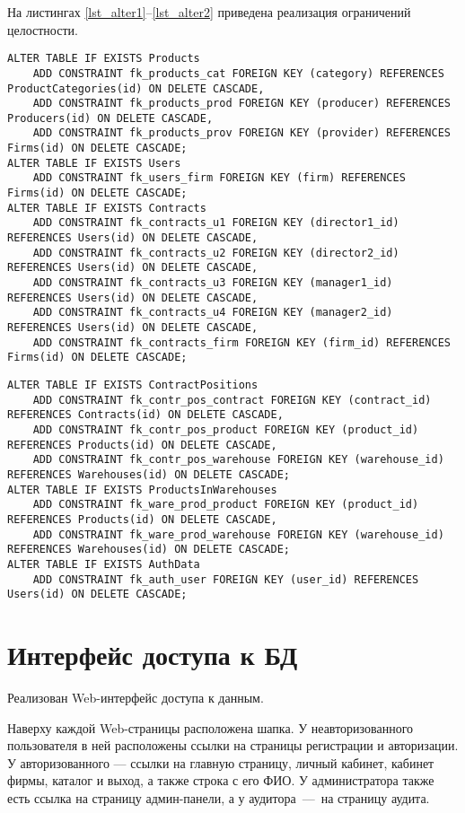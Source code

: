 На листингах \ref{lst_alter1}--\ref{lst_alter2} приведена реализация ограничений целостности.
\begin{lstlisting}[label=lst_alter1,caption=\raggedright{Реализация ограничений целостности}]
ALTER TABLE IF EXISTS Products 
	ADD CONSTRAINT fk_products_cat FOREIGN KEY (category) REFERENCES ProductCategories(id) ON DELETE CASCADE,
	ADD CONSTRAINT fk_products_prod FOREIGN KEY (producer) REFERENCES Producers(id) ON DELETE CASCADE,
	ADD CONSTRAINT fk_products_prov FOREIGN KEY (provider) REFERENCES Firms(id) ON DELETE CASCADE;
ALTER TABLE IF EXISTS Users 
	ADD CONSTRAINT fk_users_firm FOREIGN KEY (firm) REFERENCES Firms(id) ON DELETE CASCADE;
ALTER TABLE IF EXISTS Contracts 
	ADD CONSTRAINT fk_contracts_u1 FOREIGN KEY (director1_id) REFERENCES Users(id) ON DELETE CASCADE,
	ADD CONSTRAINT fk_contracts_u2 FOREIGN KEY (director2_id) REFERENCES Users(id) ON DELETE CASCADE,
	ADD CONSTRAINT fk_contracts_u3 FOREIGN KEY (manager1_id) REFERENCES Users(id) ON DELETE CASCADE,
	ADD CONSTRAINT fk_contracts_u4 FOREIGN KEY (manager2_id) REFERENCES Users(id) ON DELETE CASCADE,
	ADD CONSTRAINT fk_contracts_firm FOREIGN KEY (firm_id) REFERENCES Firms(id) ON DELETE CASCADE;
\end{lstlisting}
\newpage
\begin{lstlisting}[label=lst_alter2,caption=\raggedright{Реализация ограничений целостности (окончание)}]
ALTER TABLE IF EXISTS ContractPositions 
	ADD CONSTRAINT fk_contr_pos_contract FOREIGN KEY (contract_id) REFERENCES Contracts(id) ON DELETE CASCADE,
	ADD CONSTRAINT fk_contr_pos_product FOREIGN KEY (product_id) REFERENCES Products(id) ON DELETE CASCADE,
	ADD CONSTRAINT fk_contr_pos_warehouse FOREIGN KEY (warehouse_id) REFERENCES Warehouses(id) ON DELETE CASCADE;
ALTER TABLE IF EXISTS ProductsInWarehouses 
	ADD CONSTRAINT fk_ware_prod_product FOREIGN KEY (product_id) REFERENCES Products(id) ON DELETE CASCADE,
	ADD CONSTRAINT fk_ware_prod_warehouse FOREIGN KEY (warehouse_id) REFERENCES Warehouses(id) ON DELETE CASCADE;
ALTER TABLE IF EXISTS AuthData 
	ADD CONSTRAINT fk_auth_user FOREIGN KEY (user_id) REFERENCES Users(id) ON DELETE CASCADE;
\end{lstlisting}

\section{Интерфейс доступа к БД}
Реализован Web-интерфейс доступа к данным.

Наверху каждой Web-страницы расположена шапка.
У неавторизованного пользователя в ней расположены ссылки на страницы регистрации и авторизации. У авторизованного --- ссылки на главную страницу, личный кабинет, кабинет фирмы, каталог и выход, а также строка с его ФИО.
У администратора также есть ссылка на страницу админ-панели, а у аудитора~---~на страницу аудита.

